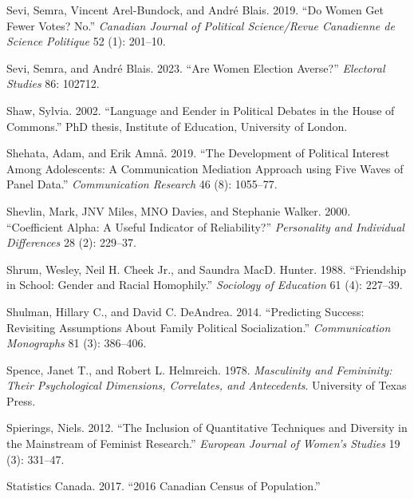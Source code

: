 \documentclass[
  letterpaper,
  DIV=11,
  numbers=noendperiod]{scrreprt}
\newlength{\cslhangindent}
\newlength{\cslentryspacingunit} %
\newenvironment{CSLReferences}[2] %
 {%
  \setlength{\parindent}{0pt}
  \ifodd #1
  \let\oldpar\par
  \def\par{\hangindent=\cslhangindent\oldpar}
  \fi
  \setlength{\parskip}{#2\cslentryspacingunit}
 }%
 {}
\begin{document}
\begin{CSLReferences}{1}{0}
\leavevmode{}%
Sevi, Semra, Vincent Arel-Bundock, and André Blais. 2019. {``{Do Women
Get Fewer Votes? No.}''} \emph{Canadian Journal of Political
Science/Revue Canadienne de Science Politique} 52 (1): 201--10.

\leavevmode{}%
Sevi, Semra, and André Blais. 2023. {``{Are Women Election Averse?}''}
\emph{Electoral Studies} 86: 102712.

\leavevmode{}%
Shaw, Sylvia. 2002. {``{Language and Eender in Political Debates in the
House of Commons}.''} PhD thesis, Institute of Education, University of
London.

\leavevmode{}%
Shehata, Adam, and Erik Amnå. 2019. {``{The Development of Political
Interest Among Adolescents: A Communication Mediation Approach using
Five Waves of Panel Data}.''} \emph{Communication Research} 46 (8):
1055--77.

\leavevmode{}%
Shevlin, Mark, JNV Miles, MNO Davies, and Stephanie Walker. 2000.
{``{Coefficient Alpha: A Useful Indicator of Reliability?}''}
\emph{Personality and Individual Differences} 28 (2): 229--37.

\leavevmode{}%
Shrum, Wesley, Neil H. Cheek Jr., and Saundra MacD. Hunter. 1988.
{``{Friendship in School: Gender and Racial Homophily}.''}
\emph{Sociology of Education} 61 (4): 227--39.

\leavevmode{}%
Shulman, Hillary C., and David C. DeAndrea. 2014. {``{Predicting
Success: Revisiting Assumptions About Family Political
Socialization}.''} \emph{Communication Monographs} 81 (3): 386--406.

\leavevmode{}%
Spence, Janet T., and Robert L. Helmreich. 1978. \emph{{Masculinity and
Femininity: Their Psychological Dimensions, Correlates, and
Antecedents}}. University of Texas Press.

\leavevmode{}%
Spierings, Niels. 2012. {``{The Inclusion of Quantitative Techniques and
Diversity in the Mainstream of Feminist Research}.''} \emph{European
Journal of Women's Studies} 19 (3): 331--47.

\leavevmode{}%
Statistics Canada. 2017. {``{2016 Canadian Census of Population}.''}


\end{CSLReferences}
\end{document}
